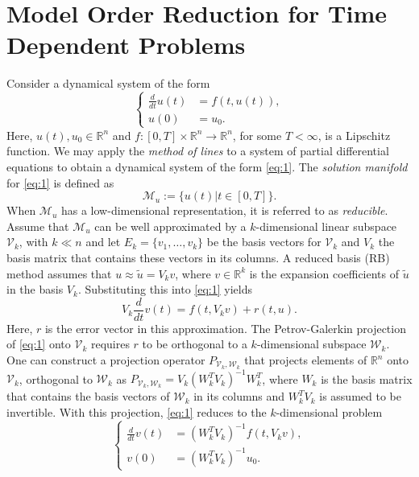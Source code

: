 \section{Model Order Reduction for Time Dependent Problems} \label{sec:mor}

Consider a dynamical system of the form
\begin{equation} \label{eq:1}
	\left\{
	\begin{aligned}
		\frac{d}{dt} u(t) &= f(t,u(t)),\\
		u(0) &= u_0.
	\end{aligned}
	\right.
\end{equation}
Here, $u(t),u_0\in \mathbb R^{n}$ and $f: [0,T]\times \mathbb R^{n} \to \mathbb R^{n}$, for some $T<\infty$, is a Lipschitz function. We may apply the \emph{method of lines} \cite{Edsberg:2008:ICM:1477735} to a system of partial differential equations to obtain a dynamical system of the form \eqref{eq:1}. The \emph{solution manifold} for \eqref{eq:1} is defined as
\begin{equation} \label{eq:2}
	\mathcal M_u := \{ u(t) | t \in [0,T] \}.
\end{equation}
When $\mathcal M_u$ has a low-dimensional representation, it is referred to as \emph{reducible}. Assume that $\mathcal M_u$ can be well approximated by a $k$-dimensional linear subspace $\mathcal V_k$, with $k\ll n$ and let $E_k = \{ v_1,\dots,v_k \}$ be the basis vectors for $\mathcal V_k$ and $V_k$ the basis matrix that contains these vectors in its columns. A reduced basis (RB) method assumes that $u \approx \tilde u = V_k v$, where $v\in \mathbb R^{k}$ is the expansion coefficients of $\tilde u$ in the basis $V_k$. Substituting this into \eqref{eq:1} yields
\begin{equation} \label{eq:3}
	V_k \frac{d}{dt} v(t) = f(t,V_{k}v) + r(t,u).	
\end{equation}
Here, $r$ is the error vector in this approximation. The Petrov-Galerkin projection of \eqref{eq:1} onto $\mathcal V_k$ requires $r$ to be orthogonal to a $k$-dimensional subspace $\mathcal W_k$. One can construct a projection operator $P_{\mathcal V_{k},\mathcal W_k}$ that projects elements of $\mathbb R^{n}$ onto $\mathcal V_k$, orthogonal to $\mathcal W_k$ as $P_{\mathcal V_{k},\mathcal W_k} = V_k(W_k^TV_k)^{-1}W_k^T$, where $W_k$ is the basis matrix that contains the basis vectors of $\mathcal W_k$ in its columns and $W_k^TV_k$ is assumed to be invertible. With this projection, \eqref{eq:1} reduces to the $k$-dimensional problem
\begin{equation} \label{eq:4}
	\left\{
	\begin{aligned}
		\frac{d}{dt} v(t) &= (W_k^TV_k)^{-1} f(t,V_{k}v),\\
		v(0) &= (W_k^TV_k)^{-1}u_0.
	\end{aligned}
	\right.
\end{equation}
